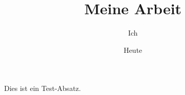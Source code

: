\documentclass[titlepage]{article}
\begin{document}
  \begin{titlepage}
    \title{Meine Arbeit}
    \author{Ich}
    \date{Heute}

    \maketitle
  \end{titlepage}

  Dies ist ein Test-Absatz.
\end{document}
